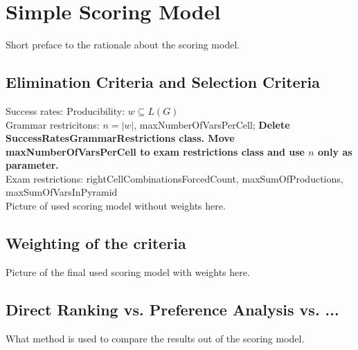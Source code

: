 
\section{Simple Scoring Model}

\noindent Short preface to the rationale about the scoring model. 

\subsection{Elimination Criteria and Selection Criteria}

\noindent Success rates: 
Producibility: $w \subseteq L(G)$\\
Grammar restricitons: $n=|w|$, maxNumberOfVarsPerCell; \textbf{Delete SuccessRatesGrammarRestrictions class. Move maxNumberOfVarsPerCell to exam restrictions class and use $n$ only as parameter.} \\
Exam restrictions: rightCellCombinationsForcedCount, maxSumOfProductions, maxSumOfVarsInPyramid\\

\noindent Picture of used scoring model without weights here. 

\subsection{Weighting of the criteria}

\noindent Picture of the final used scoring model with weights here. 

\subsection{Direct Ranking vs. Preference Analysis vs. ...}

What method is used to compare the results out of the scoring model.

 

\pagebreak